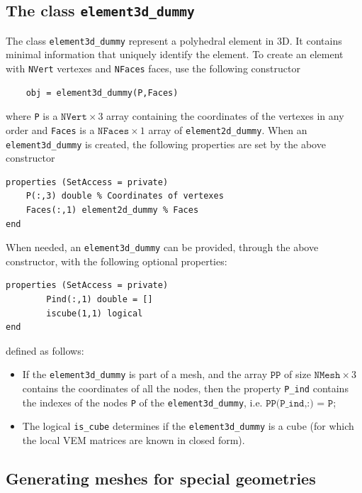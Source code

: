 \documentclass[a4paper]{article}
\begin{document}
\subsection{The class \texttt{element3d\_dummy}}
The class \texttt{element3d\_dummy} represent a polyhedral element in 3D. It contains minimal information that uniquely identify the element. To create an element with \texttt{NVert} vertexes and \texttt{NFaces} faces, use the following constructor
\begin{lstlisting}
	obj = element3d_dummy(P,Faces)
\end{lstlisting}
where \texttt{P} is a $\texttt{NVert} \times 3$ array containing the coordinates of the vertexes in any order and \texttt{Faces} is a $\texttt{NFaces} \times 1$ array of \texttt{element2d\_dummy}.  When an \texttt{element3d\_dummy} is created, the following properties are set by the above constructor
\begin{lstlisting}
properties (SetAccess = private)
	P(:,3) double % Coordinates of vertexes
	Faces(:,1) element2d_dummy % Faces
end
\end{lstlisting}
When needed, an \texttt{element3d\_dummy} can be provided, through the above constructor, with the following optional properties:
\begin{lstlisting}
properties (SetAccess = private)
        Pind(:,1) double = []
        iscube(1,1) logical
end
\end{lstlisting}
defined as follows:
\begin{itemize}
\item If the \texttt{element3d\_dummy} is part of a mesh, and the array $\texttt{PP}$ of size $\texttt{NMesh} \times 3$ contains the coordinates of all the nodes, then the property \texttt{P\_ind} contains the indexes of the nodes \texttt{P} of the \texttt{element3d\_dummy}, i.e. $\texttt{PP(P\_ind,:) = P}$;
\item The logical \texttt{is\_cube} determines if the \texttt{element3d\_dummy} is a cube (for which the local VEM matrices are known in closed form).
\end{itemize}

\subsection{Generating meshes for special geometries}
\end{document}
